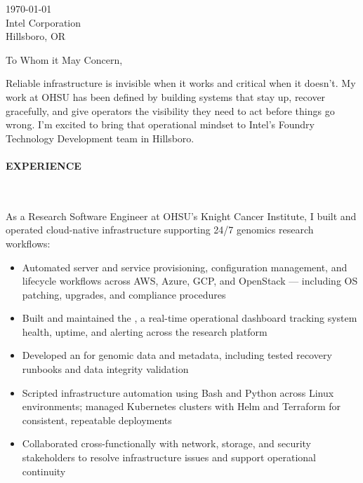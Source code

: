 



\textcolor{my-grey}{\dotfill}
\bigbreak

{\today}\\
Intel Corporation\\
Hillsboro, OR

\vspace*{2\baselineskip}

To Whom it May Concern,

\vspace*{\baselineskip}

Reliable infrastructure is invisible when it works and critical when it doesn't. My work at OHSU has been defined by building systems that stay up, recover gracefully, and give operators the visibility they need to act before things go wrong. I'm excited to bring that operational mindset to Intel's Foundry Technology Development team in Hillsboro.

\paragraph{EXPERIENCE}\

\vspace*{\baselineskip}

As a Research Software Engineer at OHSU's Knight Cancer Institute, I built and operated cloud-native infrastructure supporting 24/7 genomics research workflows:

\begin{itemize}

    \item Automated server and service provisioning, configuration management, and lifecycle workflows across AWS, Azure, GCP, and OpenStack --- including OS patching, upgrades, and compliance procedures

    \item Built and maintained the , a real-time operational dashboard tracking system health, uptime, and alerting across the research platform

    \item Developed an  for genomic data and metadata, including tested recovery runbooks and data integrity validation

    \item Scripted infrastructure automation using Bash and Python across Linux environments; managed Kubernetes clusters with Helm and Terraform for consistent, repeatable deployments

    \item Collaborated cross-functionally with network, storage, and security stakeholders to resolve infrastructure issues and support operational continuity

\end{itemize}

